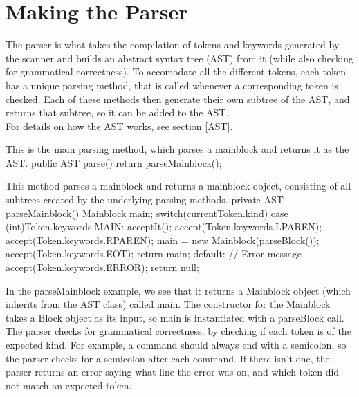 \section{Making the Parser}
The parser is what takes the compilation of tokens and keywords generated by the scanner and builds an abstract syntax tree (AST) from it (while also checking for grammatical correctness).
To accomodate all the different tokens, each token has a unique parsing method, that is called whenever a corresponding token is checked. 
Each of these methods then generate their own subtree of the AST, and returns that subtree, so it can be added to the AST. \\
For details on how the AST works, see section \ref{AST}.

\begin{source}{This is the main parsing method, which parses a mainblock and returns it as the AST.}{}
public AST parse()
        {
            return parseMainblock();
        }
\end{source}
\begin{source}{This method parses a mainblock and returns a mainblock object, consisting of all subtrees created by the underlying parsing methods.}{}
private AST parseMainblock()
        {
            Mainblock main;
            switch(currentToken.kind)
            {
                case (int)Token.keywords.MAIN:
                    acceptIt();
                    accept(Token.keywords.LPAREN);
                    accept(Token.keywords.RPAREN);
                    main = new Mainblock(parseBlock());
                    accept(Token.keywords.EOT);
                    return main;
                default:
                    // Error message
                    accept(Token.keywords.ERROR);
                    return null;
            }
        }
\end{source}
In the parseMainblock example, we see that it returns a Mainblock object (which inherits from the AST class) called main. 
The constructor for the Mainblock takes a Block object as its input, so main is instantiated with a parseBlock call. \\
The parser checks for grammatical correctness, by checking if each token is of the expected kind. 
For example, a command should always end with a semicolon, so the parser checks for a semicolon after each command. 
If there isn't one, the parser returns an error saying what line the error was on, and which token did not match an expected token.